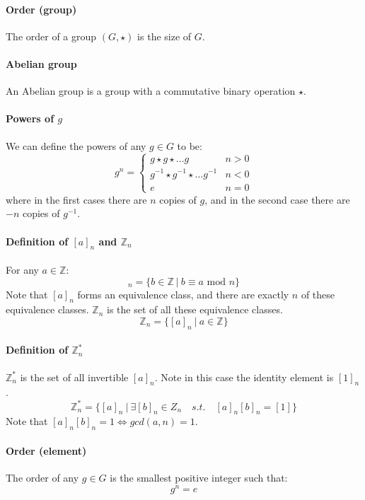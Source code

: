 \documentclass{scrartcl}
\newcommand{\Z}{\mathbb{Z}}
\begin{document}
\paragraph{Order (group)}
The order of a group $ (G, \star) $ is the size of $ G $.
\paragraph{Abelian group}
An Abelian group is a group with a commutative binary operation $ \star $.
\paragraph{Powers of $ g $}
We can define the powers of any $ g \in G $ to be:
\begin{equation}
g^{n} = 
\begin{cases}
g \star g \star ... g & n > 0 \\
g^{-1} \star g^{-1} \star ... g^{-1} & n < 0 \\
e & n = 0
\end{cases}
\end{equation}
where in the first cases there are $ n $ copies of $ g $, and in the second case there are $ -n $ copies of $ g^{-1} $.
\paragraph{Definition of $ [a]_{n} $ and $ \Z_{n} $}
For any $ a \in \Z $:
\begin{equation}
[a]_{n} = \{b \in \Z \ | \ b \equiv a \textrm{ mod } n \}
\end{equation}
Note that $ [a]_{n} $ forms an equivalence class, and there are exactly $ n $ of these equivalence classes. $ \Z_{n} $ is the set of all these equivalence classes.
\begin{equation}
\Z_{n} = \{[a]_{n} \ | \ a \in \Z \}
\end{equation}
\paragraph{Definition of $ \Z_{n}^{*} $}
$ \Z_{n}^{*} $ is the set of all invertible $ [a]_{n} $. Note in this case the identity element is $ [1]_{n} $.
\begin{equation}
\Z_{n}^{*} = \{[a]_{n} \ | \ \exists [b]_{n} \in Z_{n} \quad s.t. \quad [a]_{n}[b]_{n} = [1]\}
\end{equation}
Note that $ [a]_{n}[b]_{n} = 1 \Leftrightarrow gcd(a, n) = 1 $.
\paragraph{Order (element)}
The order of any $ g \in G $ is the smallest positive integer such that:
\begin{equation}
g^{n} = e
\end{equation}
\end{document}

